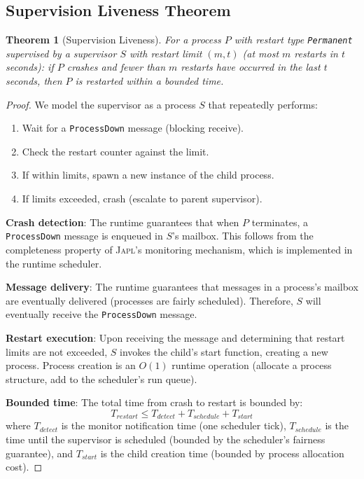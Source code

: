 \documentclass[11pt,twocolumn]{article}
\newtheorem{theorem}{Theorem}[section]
\newcommand{\japl}{\textsc{Japl}}
\begin{document}
\subsection{Supervision Liveness Theorem}

\begin{theorem}[Supervision Liveness]\label{thm:supervision-liveness}
For a process $P$ with restart type \texttt{Permanent} supervised by a supervisor $S$ with restart limit $(m, t)$ (at most $m$ restarts in $t$ seconds): if $P$ crashes and fewer than $m$ restarts have occurred in the last $t$ seconds, then $P$ is restarted within a bounded time.
\end{theorem}

\begin{proof}
We model the supervisor as a process $S$ that repeatedly performs:
\begin{enumerate}
  \item Wait for a \texttt{ProcessDown} message (blocking receive).
  \item Check the restart counter against the limit.
  \item If within limits, spawn a new instance of the child process.
  \item If limits exceeded, crash (escalate to parent supervisor).
\end{enumerate}

\textbf{Crash detection}: The runtime guarantees that when $P$ terminates, a \texttt{ProcessDown} message is enqueued in $S$'s mailbox. This follows from the completeness property of \japl{}'s monitoring mechanism, which is implemented in the runtime scheduler.

\textbf{Message delivery}: The runtime guarantees that messages in a process's mailbox are eventually delivered (processes are fairly scheduled). Therefore, $S$ will eventually receive the \texttt{ProcessDown} message.

\textbf{Restart execution}: Upon receiving the message and determining that restart limits are not exceeded, $S$ invokes the child's start function, creating a new process. Process creation is an $O(1)$ runtime operation (allocate a process structure, add to the scheduler's run queue).

\textbf{Bounded time}: The total time from crash to restart is bounded by:
\[
  T_{\mathit{restart}} \leq T_{\mathit{detect}} + T_{\mathit{schedule}} + T_{\mathit{start}}
\]
where $T_{\mathit{detect}}$ is the monitor notification time (one scheduler tick), $T_{\mathit{schedule}}$ is the time until the supervisor is scheduled (bounded by the scheduler's fairness guarantee), and $T_{\mathit{start}}$ is the child creation time (bounded by process allocation cost).


\end{proof}
\end{document}
